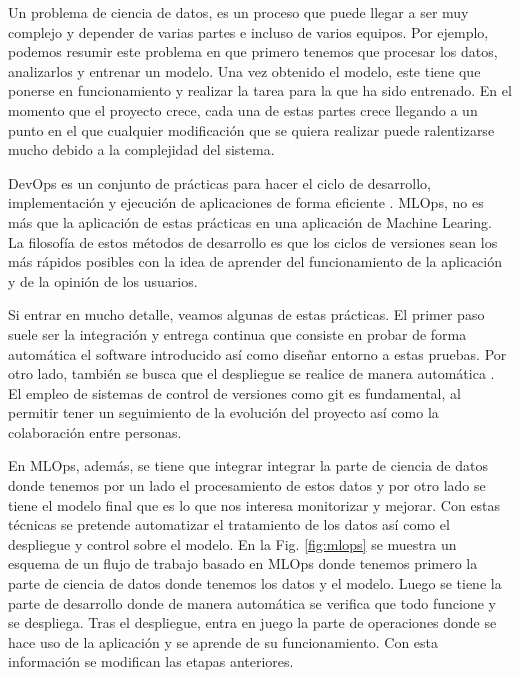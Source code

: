 \documentclass[a4paper,12pt,twoside,titlepage]{article}
\begin{document}
Un problema de ciencia de datos, es un proceso que puede llegar a ser muy complejo y depender de varias partes e incluso de varios equipos. Por ejemplo, podemos resumir este problema en que primero tenemos que procesar los datos, analizarlos y entrenar un modelo. Una vez obtenido el modelo, este tiene que ponerse en funcionamiento y realizar la tarea para la que ha sido entrenado. En el momento que el proyecto crece, cada una de estas partes crece llegando a un punto en el que cualquier modificación que se quiera realizar puede ralentizarse mucho debido a la complejidad del sistema.

DevOps es un conjunto de prácticas para hacer el ciclo de desarrollo, implementación y ejecución de aplicaciones de forma eficiente \cite{mlops_nvidea}. MLOps, no es más que la aplicación de estas prácticas en una aplicación de Machine Learing. La filosofía de estos métodos de desarrollo es que los ciclos de versiones sean los más rápidos posibles con la idea de aprender del funcionamiento de la aplicación y de la opinión de los usuarios.

Si entrar en mucho detalle, veamos algunas de estas prácticas. El primer paso suele ser la integración y entrega continua que consiste en probar de forma automática el software introducido así como diseñar entorno a estas pruebas. Por otro lado, también se busca que el despliegue se realice de manera automática \cite{mlops_practical}. El empleo de sistemas de control de versiones como git es fundamental, al permitir tener un seguimiento de la evolución del proyecto así como la colaboración entre personas. 

En MLOps, además, se tiene que integrar integrar la parte de ciencia de datos donde tenemos por un lado el procesamiento de estos datos y por otro lado se tiene el modelo final que es lo que nos interesa monitorizar y mejorar. Con estas técnicas se pretende automatizar el tratamiento de los datos así como el despliegue y control sobre el modelo. En la Fig. \ref{fig:mlops} se muestra un esquema de un flujo de trabajo basado en MLOps donde tenemos primero la parte de ciencia de datos donde tenemos los datos y el modelo. Luego se tiene la parte de desarrollo donde de manera automática se verifica que todo funcione y se despliega. Tras el despliegue, entra en juego la parte de operaciones donde se hace uso de la aplicación y se aprende de su funcionamiento. Con esta información se modifican las etapas anteriores.
\end{document}

